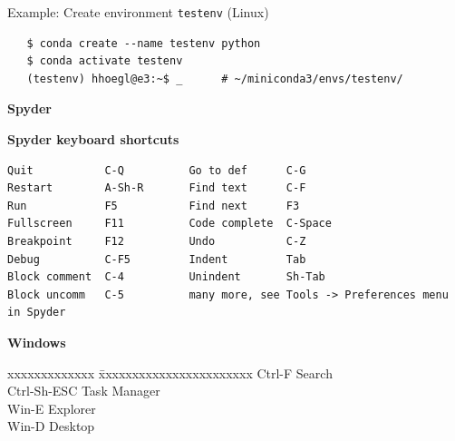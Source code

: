 \documentclass[9pt,a4wide]{extarticle}
\begin{document}
Example: Create environment {\tt testenv} (Linux)

\begin{verbatim}
   $ conda create --name testenv python
   $ conda activate testenv
   (testenv) hhoegl@e3:~$ _      # ~/miniconda3/envs/testenv/
\end{verbatim}


\medskip
{\bf Spyder}

{\bf Spyder keyboard shortcuts}

\begin{verbatim}
Quit           C-Q          Go to def      C-G
Restart        A-Sh-R       Find text      C-F
Run            F5           Find next      F3
Fullscreen     F11          Code complete  C-Space
Breakpoint     F12          Undo           C-Z
Debug          C-F5         Indent         Tab
Block comment  C-4          Unindent       Sh-Tab
Block uncomm   C-5          many more, see Tools -> Preferences menu in Spyder
\end{verbatim}      


\medskip

{\bf Windows}


\begin{tabbing}
    xxxxxxxxxxxxx \= xxxxxxxxxxxxxxxxxxxxxxx \kill
    Ctrl-F        \> Search  \\
    Ctrl-Sh-ESC   \> Task Manager \\
    Win-E         \> Explorer \\
    Win-D         \> Desktop  \\
\end{tabbing}

\medskip



\end{document}
